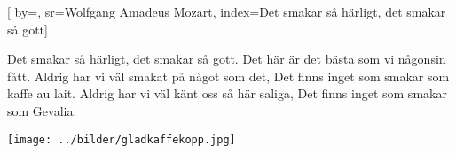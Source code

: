

[ 		%
	by={},					%
	sr={Wolfgang Amadeus Mozart},					%
	index={Det smakar så härligt, det smakar så gott}]						%
	
\beginverse*						%
Det smakar så härligt, det smakar så gott.
Det här är det bästa som vi någonsin fått. 
Aldrig har vi väl smakat på något som det,
Det finns inget som smakar som kaffe au lait.
Aldrig har vi väl känt oss så här saliga,
Det finns inget som smakar som Gevalia.
\endverse							%

\endsong							%

\begin{intersong}
 \begin{center}
\texttt{[image: ../bilder/gladkaffekopp.jpg]} 
\end{center}
\end{intersong}